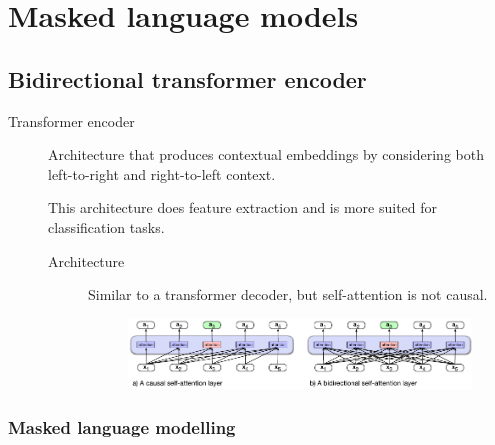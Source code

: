 \chapter{Masked language models}



\section{Bidirectional transformer encoder}

\begin{description}
    \item[Transformer encoder] 
        Architecture that produces contextual embeddings by considering both left-to-right and right-to-left context.

        \begin{remark}
            This architecture does feature extraction and is more suited for classification tasks.
        \end{remark}

        \begin{description}
            \item[Architecture]
                Similar to a transformer decoder, but self-attention is not causal.

                \begin{figure}[H]
                    \centering
                    \includegraphics[width=0.75\linewidth]{./img/_decoder_vs_encoder.pdf}
                \end{figure}
        \end{description}
\end{description}


\subsection{Masked language modelling}

